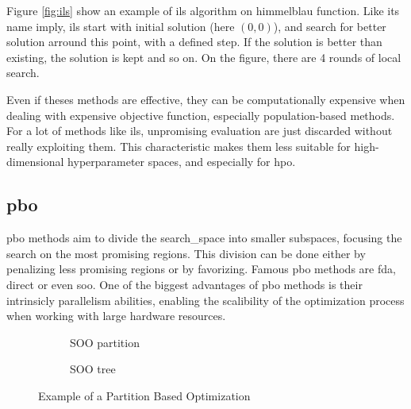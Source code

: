 Figure \ref{fig:ils} show an example of \acrshort{ils} algorithm on \gls{himmelblau} function. Like its name imply, \acrfull{ils} start with initial solution (here $(0,0)$), and search for better solution arround this point, with a defined step. If the solution is better than existing, the solution is kept and so on. On the figure, there are 4 rounds of local search.

Even if theses methods are effective, they can be computationally expensive when dealing with expensive objective function, especially population-based methods. For a lot of methods like \acrshort{ils}, unpromising evaluation are just discarded without really exploiting them. This characteristic makes them less suitable for high-dimensional \gls{hyperparameter} spaces, and especially for \acrshort{hpo}.

\subsection{\acrfull{pbo}} 
\label{sec:pbo}  
 

\acrfull{pbo} methods aim to divide the \gls{search_space} into smaller subspaces, focusing the search on the most promising regions. This division can be done either by penalizing less promising regions or by favorizing. Famous \acrshort{pbo} methods are \acrfull{fda}\cite{nakib_deterministic_2017}, \acrfull{direct} \cite{jones_lipschitzian_1993} or even \acrfull{soo}\cite{munos_optimistic_2011}. One of the biggest advantages of \acrshort{pbo} methods is their intrinsicly parallelism abilities, enabling the scalibility of the optimization process when working with large hardware resources.

\begin{figure}[h]
    \centering
    \begin{subfigure}{.45\linewidth}
      \centering
      
      \caption{SOO partition}
      \label{fig:pbo_partition}
    \end{subfigure}%
    \begin{subfigure}{.45\linewidth}
      \centering
      
      \caption{SOO tree}
      \label{fig:pbo_tree}
    \end{subfigure}
    \caption{Example of a Partition Based Optimization}
    \label{fig:pbo}
\end{figure}

